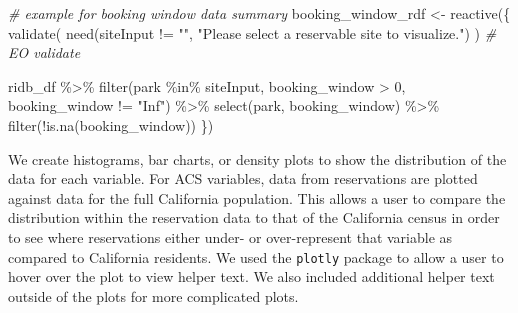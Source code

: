 \documentclass[
  11 pt,
  openany]{book}
\newenvironment{Shaded}{\begin{snugshade}}{\end{snugshade}}
\newcommand{\CommentTok}[1]{\textcolor[rgb]{0.56,0.35,0.01}{\textit{#1}}}
\newcommand{\DecValTok}[1]{\textcolor[rgb]{0.00,0.00,0.81}{#1}}
\newcommand{\FunctionTok}[1]{\textcolor[rgb]{0.00,0.00,0.00}{#1}}
\newcommand{\NormalTok}[1]{#1}
\newcommand{\OtherTok}[1]{\textcolor[rgb]{0.56,0.35,0.01}{#1}}
\newcommand{\SpecialCharTok}[1]{\textcolor[rgb]{0.00,0.00,0.00}{#1}}
\newcommand{\StringTok}[1]{\textcolor[rgb]{0.31,0.60,0.02}{#1}}
\begin{document}
\begin{Shaded}
\begin{Highlighting}[]
\CommentTok{\# example for booking window data summary}
\NormalTok{booking\_window\_rdf }\OtherTok{\textless{}{-}} \FunctionTok{reactive}\NormalTok{(\{}
  \FunctionTok{validate}\NormalTok{(}
    \FunctionTok{need}\NormalTok{(siteInput }\SpecialCharTok{!=} \StringTok{""}\NormalTok{,}
         \StringTok{"Please select a reservable site to visualize."}\NormalTok{)}
\NormalTok{  ) }\CommentTok{\# EO validate}
  
\NormalTok{  ridb\_df }\SpecialCharTok{\%\textgreater{}\%}
    \FunctionTok{filter}\NormalTok{(park }\SpecialCharTok{\%in\%}\NormalTok{ siteInput,}
\NormalTok{           booking\_window }\SpecialCharTok{\textgreater{}} \DecValTok{0}\NormalTok{,}
\NormalTok{           booking\_window }\SpecialCharTok{!=} \StringTok{"Inf"}\NormalTok{) }\SpecialCharTok{\%\textgreater{}\%} 
    \FunctionTok{select}\NormalTok{(park, booking\_window) }\SpecialCharTok{\%\textgreater{}\%} 
    \FunctionTok{filter}\NormalTok{(}\SpecialCharTok{!}\FunctionTok{is.na}\NormalTok{(booking\_window))}
\NormalTok{\})}
\end{Highlighting}
\end{Shaded}

We create histograms, bar charts, or density plots to show the distribution of the data for each variable. For ACS variables, data from reservations are plotted against data for the full California population. This allows a user to compare the distribution within the reservation data to that of the California census in order to see where reservations either under- or over-represent that variable as compared to California residents. We used the \texttt{plotly} package \citep{R-plotly} to allow a user to hover over the plot to view helper text. We also included additional helper text outside of the plots for more complicated plots.
\end{document}
